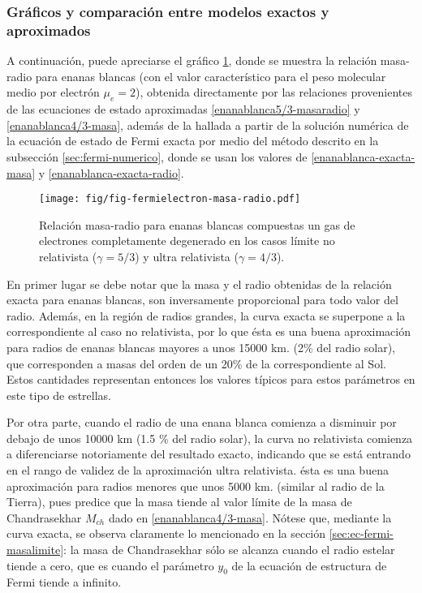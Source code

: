 \subsubsection{Gráficos y comparación entre modelos exactos y aproximados}
A continuación, puede apreciarse el gráfico \ref{graficomasa-radio}, donde se muestra la relación masa-radio para enanas blancas (con el valor característico para el peso molecular medio por electrón $\mu_e=2$), obtenida directamente por las relaciones provenientes de las ecuaciones de estado aproximadas \eqref{enanablanca5/3-masaradio} y \eqref{enanablanca4/3-masa}, además de la hallada a partir de la solución numérica de la ecuación de estado de Fermi exacta por medio del método descrito en la subsección \ref{sec:fermi-numerico}, donde se usan los valores de \eqref{enanablanca-exacta-masa} y \eqref{enanablanca-exacta-radio}.

\begin{figure}[H]
\centering
\texttt{[image: fig/fig-fermielectron-masa-radio.pdf]}
\caption{Relación masa-radio para enanas blancas compuestas un gas de electrones completamente degenerado en los casos límite no relativista ($\gamma=5/3$) y ultra relativista ($\gamma=4/3$).}\label{graficomasa-radio}
\end{figure}

En primer lugar se debe notar que la masa y el radio obtenidas de la relación exacta para enanas blancas, son inversamente proporcional para todo valor del radio. Además, en la región de radios grandes, la curva exacta se superpone a la correspondiente al caso no relativista, por lo que ésta es una buena aproximación para radios de enanas blancas mayores a unos 15000 km. (2\% del radio solar), que corresponden a masas del orden de un 20\% de la correspondiente al Sol. Estos cantidades representan entonces los valores típicos para estos parámetros en este tipo de estrellas.

Por otra parte, cuando el radio de una enana blanca comienza a disminuir por debajo de unos 10000 km (1.5 \% del radio solar), la curva no relativista comienza a diferenciarse notoriamente del resultado exacto, indicando que se está entrando en el rango de validez de la aproximación ultra relativista. ésta es una buena aproximación para radios menores que unos 5000 km. (similar al radio de la Tierra), pues predice que la masa tiende al valor límite de la masa de Chandrasekhar $M_{ch}$ dado en \eqref{enanablanca4/3-masa}. Nótese que, mediante la curva exacta, se observa claramente lo mencionado en la sección \ref{sec:ec-fermi-masalimite}: la masa de Chandrasekhar sólo se alcanza cuando el radio estelar tiende a cero, que es cuando el parámetro $y_0$ de la ecuación de estructura de Fermi tiende a infinito.


